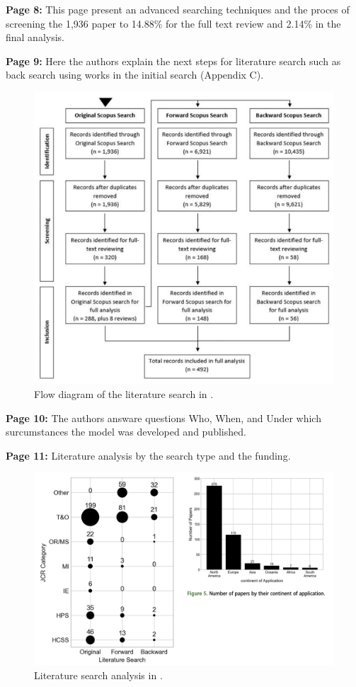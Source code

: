     \textbf{Page 8:}
    This page present an advanced searching techniques and the proces of screening the 1,936 paper to 14.88\% for the full text review and 2.14\% in the final analysis. 
    
    \textbf{Page 9:}
    Here the authors explain the next steps for literature search such as back search using works in the initial search (Appendix C).
    \begin{figure}[H]
        \centering
        \includegraphics[width=.8\textwidth]{figures/0005_SR02GB23/fig2.png}
        \caption{Flow diagram of the literature search in \cite{x122}.}
        \label{fig2:SR02GB23}
    \end{figure}
    
    \textbf{Page 10:}
    The authors answare questions Who, When, and Under which surcumstances the model was developed and published.
    
    \textbf{Page 11:}
    Literature analysis by the search type and the funding.
    \begin{figure}[H]
        \centering
        \includegraphics[width=.8\textwidth]{figures/0005_SR02GB23/fig3.png}
        \caption{Literature search analysis in \cite{x122}.}
        \label{fig3:SR02GB23}
    \end{figure}

